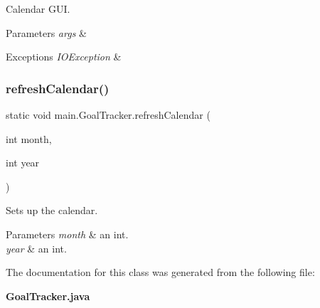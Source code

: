 Calendar G\+UI.


\begin{DoxyParams}{Parameters}
{\em args} & \\
\hline
\end{DoxyParams}

\begin{DoxyExceptions}{Exceptions}
{\em I\+O\+Exception} & \\
\hline
\end{DoxyExceptions}
\mbox{\label{classmain_1_1_goal_tracker_a8257e39078e30681f0cc19ebc86d2041}} 
\subsubsection{refresh\+Calendar()}
{\footnotesize\ttfamily static void main.\+Goal\+Tracker.\+refresh\+Calendar (\begin{DoxyParamCaption}\item[{int}]{month,  }\item[{int}]{year }\end{DoxyParamCaption})\hspace{0.3cm}{\ttfamily [static]}}

Sets up the calendar.


\begin{DoxyParams}{Parameters}
{\em month} & an int. \\
\hline
{\em year} & an int. \\
\hline
\end{DoxyParams}


The documentation for this class was generated from the following file\+:\begin{DoxyCompactItemize}
\item 
\textbf{ Goal\+Tracker.\+java}\end{DoxyCompactItemize}
